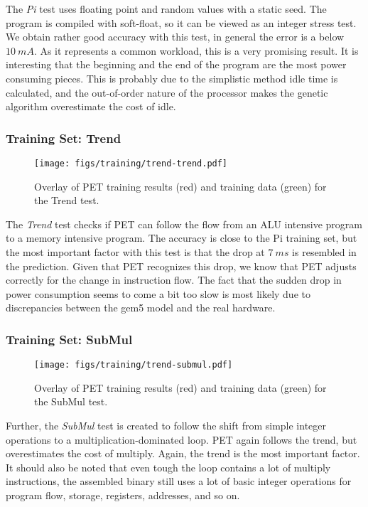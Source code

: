 The \emph{Pi} test uses floating point and random values with a static seed. The
program is compiled with soft-float, so it can be viewed as an integer stress
test. We obtain rather good accuracy with this test, in general the error is a
below $10~mA$. As it represents a common workload, this is a very promising
result. It is interesting that the beginning and the end of the program are the
most power consuming pieces. This is probably due to the simplistic method idle
time is calculated, and the out-of-order nature of the processor makes the
genetic algorithm overestimate the cost of idle.

\subsubsection{Training Set: Trend}
\begin{figure}[htb]
    \centering
    \texttt{[image: figs/training/trend-trend.pdf]}
    \caption{Overlay of PET training results (red) and training data (green) for the Trend test.}
    \label{fig:trend-training}
\end{figure}

The \emph{Trend} test checks if PET can follow the flow from an ALU intensive
program to a memory intensive program. The accuracy is close to the Pi training
set, but the most important factor with this test is that the drop at $7~ms$ is
resembled in the prediction. Given that PET recognizes this drop, we know that
PET adjusts correctly for the change in instruction flow. The fact that the
sudden drop in power consumption seems to come a bit too slow is most likely due
to discrepancies between the gem5 model and the real hardware.

\newpage

\subsubsection{Training Set: SubMul}
\begin{figure}[htb]
    \centering
    \texttt{[image: figs/training/trend-submul.pdf]}
    \caption{Overlay of PET training results (red) and training data (green) for the SubMul test.}
    \label{fig:submul-training}
\end{figure}

Further, the \emph{SubMul} test is created to follow the shift from simple
integer operations to a multiplication-dominated loop. PET again follows the
trend, but overestimates the cost of multiply. Again, the trend is the most
important factor. It should also be noted that even tough the loop contains a
lot of multiply instructions, the assembled binary still uses a lot of basic
integer operations for program flow, storage, registers, addresses, and so on.

